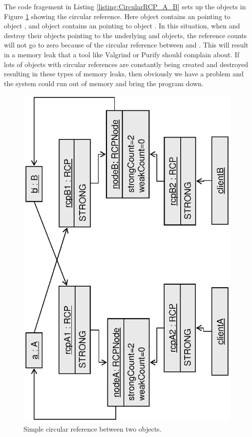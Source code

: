 \documentclass[pdf,ps2pdf,11pt]{SANDreport}
\begin{document}
The code fragement in Listing {}\ref{listing:CircularRCP_A_B} sets up
the objects in Figure {}\ref{fig:CircularRCP_A_B} showing the circular
reference.  Here object {} contains an {}
pointing to object {}, and object {} contains an
{} pointing to object {}.  In this situation,
when {} and {} destroy their
{} objects pointing to the underlying {} and
{} objects, the reference counts will not go to zero because
of the circular reference between {} and {}.  This
will result in a memory leak that a tool like Valgrind or Purify
should complain about.  If lots of objects with circular references
are constantly being created and destroyed resulting in these types of
memory leaks, then obviously we have a problem and the system could
run out of memory and bring the program down.

{\bsinglespace
\begin{figure}
\begin{center}
\includegraphics*[angle=270,scale=0.65]{CircularRCP_A_B}
\end{center}
\caption{
\label{fig:CircularRCP_A_B}
Simple circular reference between two objects.  }
\end{figure}
\esinglespace}
\end{document}
